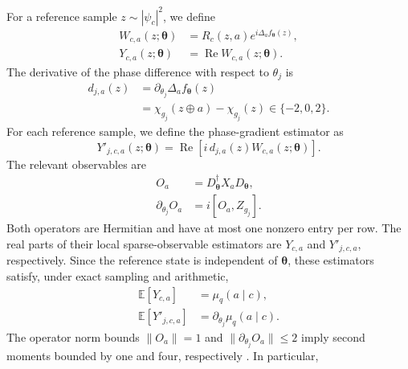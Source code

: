 \documentclass[pra,aps,10pt,twocolumn,floatfix,superscriptaddress, notitlepage,longbibliography]{revtex4-2}
\newcommand{\E}{\mathbb{E}}
\begin{document}
For a reference sample $z\sim|\psi_c|^2$, we define
\begin{equation}
\begin{aligned}
    W_{c,a}(z;\boldsymbol{\theta})
    &=
    R_c(z,a)
    e^{i\Delta_a f_{\boldsymbol{\theta}}(z)},\\
    Y_{c,a}(z;\boldsymbol{\theta})
    &=
    \operatorname{Re}
    W_{c,a}(z;\boldsymbol{\theta}).
\end{aligned}
\label{eq:ratio-sample}
\end{equation}
The derivative of the phase difference with respect to $\theta_j$ is
\begin{equation}
\begin{aligned}
    d_{j,a}(z)
    &=\partial_{\theta_j}\Delta_a f_{\boldsymbol\theta}(z)\\
    &=\chi_{g_j}(z\oplus a)-\chi_{g_j}(z)
    \in\{-2,0,2\}.
\end{aligned}
\end{equation}
For each reference sample, we define the phase-gradient estimator as
\begin{equation}
    Y'_{j,c,a}(z;\boldsymbol\theta)
    =\operatorname{Re}\!\left[
        i\,d_{j,a}(z)W_{c,a}(z;\boldsymbol\theta)
    \right].
    \label{eq:conditional-phase-gradient}
\end{equation}
The relevant observables are
\begin{equation}
\begin{aligned}
    O_a&=D_{\boldsymbol\theta}^{\dagger}X_aD_{\boldsymbol\theta},\\
    \partial_{\theta_j}O_a&=i[O_a,Z_{g_j}].
\end{aligned}
\end{equation}
Both operators are Hermitian and have at most one nonzero entry per row. The real parts of their local sparse-observable estimators are $Y_{c,a}$ and $Y'_{j,c,a}$, respectively. Since the reference state is independent of $\boldsymbol\theta$, these estimators satisfy, under exact sampling and arithmetic,
\begin{equation}
\begin{aligned}
    \E[Y_{c,a}]&=\mu_q(a\mid c),\\
    \E[Y'_{j,c,a}]&=\partial_{\theta_j}\mu_q(a\mid c).
\end{aligned}
\label{eq:conditional-estimation-guarantee}
\end{equation}
The operator norm bounds $\|O_a\|=1$ and $\|\partial_{\theta_j}O_a\|\leq2$ imply second moments bounded by one and four, respectively \cite[Sec.~3.4]{havlicekAmplitudeRatiosNeural2023}. In particular,
\end{document}
